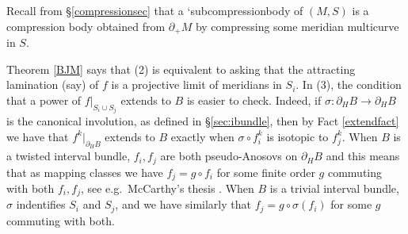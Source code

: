 \documentclass[12pt]{amsart}
\theoremstyle{definition}
\theoremstyle{remark}
\begin{document}
Recall from \S \ref{compressionsec} that a `subcompressionbody of $(M,S)$ is a compression body obtained from $\partial_+ M$ by compressing some meridian multicurve in $S$. 

Theorem \ref{BJM} says that (2) is equivalent to asking that the attracting lamination (say) of $f$ is a projective limit of meridians in $S_i$. In (3), the condition that a power of $f|_{S_i\cup S_j}$ extends to $B$ is easier to check. Indeed, if $\sigma : \partial_H B \longrightarrow \partial_HB $ is the canonical involution, as defined in \S \ref{sec:ibundle}, then by Fact \ref{extendfact} we have that $f^k|_{\partial_HB}$ extends to $B$ exactly when $\sigma \circ f_i^k $ is isotopic to $f_j^k$. When $B$ is a twisted interval bundle, $f_i,f_j$ are both pseudo-Anosovs on $\partial_HB$ and this means that as mapping classes we have $f_j = g \circ f_i$ for some finite order $g$ commuting with both $f_i,f_j$, see e.g.\ McCarthy's thesis \cite{mccarthy1982normalizers}. When $B$ is a trivial interval bundle, $\sigma$ indentifies $S_i$ and $S_j$, and we have similarly that $f_j=g \circ \sigma(f_i)$ for some $g$ commuting with both.
	
\end{document}
